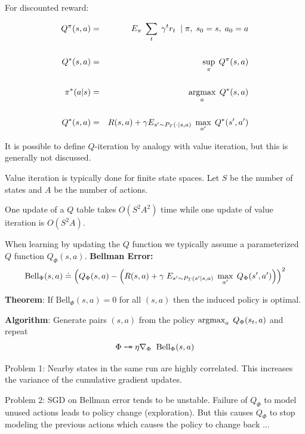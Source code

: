 {

For discounted reward:

\begin{eqnarray*}
  Q^\pi(s,a) & = & E_\pi\;\sum_t \;\gamma^tr_t \;\;|\; \pi, \; s_0 = s,\;a_0 = a \\
  \\
  Q^*(s,a) & = & \sup_\pi \;Q^\pi(s,a) \\
  \\
  \pi^*(a|s) & = & \operatorname*{argmax}_a\;Q^*(s,a) \\
  \\
  Q^*(s,a) & = & R(s,a) + \gamma E_{s' \sim P_T(\cdot|s,a)}\;\max_{a'}\; Q^*(s',a')
\end{eqnarray*}


It is possible to define $Q$-iteration by analogy with value iteration, but this is generally not discussed.

\vfill
Value iteration is typically done for finite state spaces.  Let $S$ be the number of states and $A$ be the number of actions.

\vfill
One update of a $Q$ table takes $O(S^2A^2)$ time while one update of value iteration is $O(S^2A)$.


When learning by updating the $Q$ function we typically assume a parameterized $Q$ function $Q_\Phi(s,a)$.
\vfill
{\bf Bellman Error:}
{\huge $$\mathrm{Bell}_\Phi(s,a) \doteq \left(Q_\Phi(s,a) - \left(R(s,a) + \gamma\;E_{s' \sim P_T(s'|s,a)}\;\max_{a'}\;Q_\Phi(s',a')\right)\right)^2$$}

{\bf Theorem}: If $\mathrm{Bell}_\Phi(s,a) = 0$ for all $(s,a)$ then the induced policy is optimal.

\vfill
{\bf Algorithm}: Generate pairs $(s,a)$ from the policy $\operatorname*{argmax}_a\;Q_\Phi(s_t,a)$ and repeat
$$\Phi \;\mbox{\tt -=}\; \eta \nabla_\Phi \;\; \mathrm{Bell}_\Phi(s,a)$$



Problem 1: Nearby states in the same run are highly correlated.  This increases the variance of the cumulative gradient updates.

\vfill
Problem 2: SGD on Bellman error tends to be unstable. Failure of $Q_\Phi$ to model unused actions leads to policy change (exploration).
But this causes $Q_\Phi$ to stop modeling the previous actions
which causes the policy to change back ...

}
